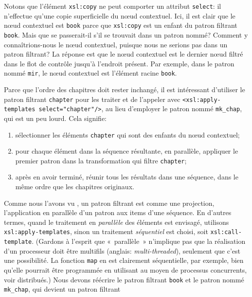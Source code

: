 Notons que l'élément \texttt{xsl:copy} ne peut comporter un attribut
\texttt{select}: il n'effectue qu'une copie superficielle du nœud
contextuel. Ici, il est clair que le nœud contextuel est
\texttt{book} parce que \texttt{xsl:copy} est un enfant du patron
filtrant \texttt{book}. Mais que se passerait-il s'il se trouvait dans
un patron nommé? Comment y connaîtrions-nous le nœud contextuel,
puisque nous ne serions pas dans un patron filtrant? La réponse est
que le nœud contextuel est le dernier nœud filtré dans le flot
de contrôle jusqu'à l'endroit présent. Par exemple, dans le patron
nommé \texttt{mir}, le nœud contextuel est l'élément racine
\texttt{book}.

Parce que l'ordre des chapitres doit rester inchangé, il est
intéressant d'utiliser le patron filtrant \texttt{chapter} pour les
traiter et de l'appeler avec \texttt{<xsl:apply-templates
  select="chapter"/>}, au lieu d'employer le patron nommé
\texttt{mk\_chap}, qui est un peu lourd. Cela signifie:
\begin{enumerate}

\item sélectionner les éléments \texttt{chapter} qui sont des enfants
  du nœud contextuel;

\item pour chaque élément dans la séquence résultante, en parallèle,
  appliquer le premier patron dans la transformation qui filtre
  \texttt{chapter};

\item après en avoir terminé, réunir tous les résultats dans une
  séquence, dans le même ordre que les chapitres originaux.

\end{enumerate}
Comme nous l'avons vu , un patron filtrant est
comme une projection, l'application en parallèle d'un patron aux items
d'une séquence. En d'autres termes, quand le traitement en
\emph{parallèle} des éléments est envisagé, utilisons
\texttt{xsl:apply-templates}, sinon un traitement \emph{séquentiel}
est choisi, soit \texttt{xsl:call-template}. (Gardons à l'esprit que
«~parallèle~» n'implique pas que la réalisation d'un processeur \XSLT
doit être multifils (anglais: \emph{multi-threaded}), seulement que
c'est une possibilité. La fonction \texttt{map} en \Erlang est
clairement séquentielle, par exemple, bien qu'elle pourrait être
programmée en utilisant au moyen de processus concurrents, voir
distribués.) Nous devons réécrire le patron filtrant \texttt{book} et
le patron nommé \texttt{mk\_chap}, qui devient un patron filtrant
